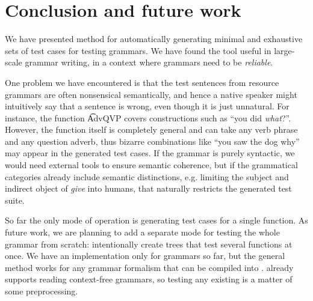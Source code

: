 

\section{Conclusion and future work}

We have presented method for automatically generating minimal and
exhaustive sets of test cases for testing grammars.  We have found the
tool useful in large-scale grammar writing, in a context where
grammars need to be \emph{reliable}.

One problem we have encountered is that the test sentences from
resource grammars are often nonsensical semantically, and hence a
native speaker might intuitively say that a sentence is wrong, even
though it is just unnatural.  For instance, the function \t{AdvQVP}
covers constructions such as ``you did \emph{what}?''. However, the
function itself is completely general and can take any verb phrase and
any question adverb, thus bizarre combinations like ``you saw the dog
why'' may appear in the generated test cases. If the grammar is purely
syntactic, we would need external tools to ensure semantic coherence,
but if the grammatical categories already include semantic
distinctions, e.g. limiting the subject and indirect object of
\emph{give} into humans, that naturally restricts the generated test
suite.


So far the only mode of operation is generating test cases for a
single function. 
As future work, we are planning to add a separate
mode for testing the whole grammar from scratch: intentionally create
trees that test several functions at once.
We have an implementation only for \gf{} grammars so far, but the
general method works for any grammar formalism that can be compiled
into \pmcfg{}. \gf{} already supports reading context-free grammars,
so testing any existing \cfg{} is a matter of some preprocessing. 

